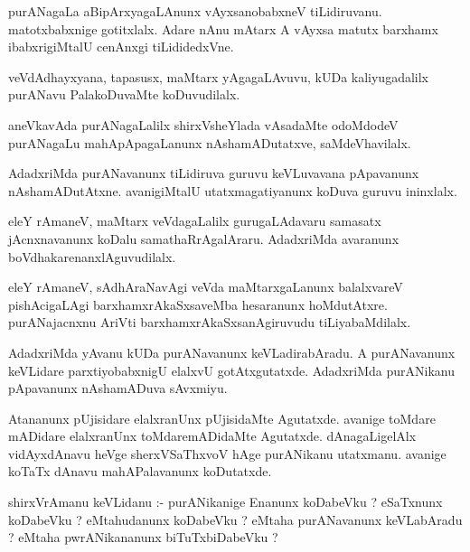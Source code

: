 \documentclass{article}
\begin{document}
\begin{mn}
purANagaLa  aBipArxyagaLAnunx  vAyxsanobabxneV  tiLidiruvanu.  matotxbabxnige  gotitxlalx.  Adare  nAnu  
mAtarx  A  vAyxsa  matutx  barxhamx  ibabxrigiMtalU  cenAnxgi  tiLididedxVne.
\end{mn}

\begin{mn}
veVdAdhayxyana, tapasusx,  maMtarx  yAgagaLAvuvu,  kUDa  kaliyugadalilx  purANavu  PalakoDuvaMte  koDuvudilalx.
\end{mn}

\begin{mn}
aneVkavAda  purANagaLalilx   shirxVsheYlada  vAsadaMte  odoMdodeV  purANagaLu  mahApApagaLanunx  
nAshamADutatxve,  saMdeVhavilalx.  
\end{mn}

\begin{mn}
AdadxriMda  purANavanunx  tiLidiruva  guruvu  keVLuvavana  pApavanunx  nAshamADutAtxne.  avanigiMtalU  
utatxmagatiyanunx  koDuva  guruvu  ininxlalx.
\end{mn}

\begin{mn}
eleY  rAmaneV,  maMtarx  veVdagaLalilx  gurugaLAdavaru  samasatx  jAcnxnavanunx  koDalu  samathaRrAgalAraru.  
AdadxriMda  avaranunx  boVdhakarenanxlAguvudilalx.
\end{mn}

\begin{mn}
eleY  rAmaneV,  sAdhAraNavAgi  veVda  maMtarxgaLanunx  balalxvareV  pishAcigaLAgi  barxhamxrAkaSxsaveMba  
hesaranunx  hoMdutAtxre.  purANajacnxnu  AriVti  barxhamxrAkaSxsanAgiruvudu  tiLiyabaMdilalx.
\end{mn}

\begin{mn}
AdadxriMda  yAvanu  kUDa  purANavanunx  keVLadirabAradu.  A  purANavanunx  keVLidare  parxtiyobabxnigU  
elalxvU  gotAtxgutatxde.  AdadxriMda  purANikanu  pApavanunx  nAshamADuva  sAvxmiyu.
\end{mn}

\begin{mn}
Atananunx  pUjisidare  elalxranUnx  pUjisidaMte  Agutatxde.  avanige  toMdare  mADidare  elalxranUnx  
toMdaremADidaMte  Agutatxde.  dAnagaLigelAlx  vidAyxdAnavu  heVge  sherxVSaThxvoV  hAge  purANikanu  
utatxmanu.  avanige   koTaTx  dAnavu  mahAPalavanunx  koDutatxde.
\end{mn}

\begin{mn}
shirxVrAmanu  keVLidanu :- purANikanige  Enanunx  koDabeVku ?  eSaTxnunx  koDabeVku ?  eMtahudanunx  
koDabeVku ?  eMtaha  purANavanunx  keVLabAradu ?  eMtaha  pwrANikananunx  biTuTxbiDabeVku ?
\end{mn}
\end{document}
